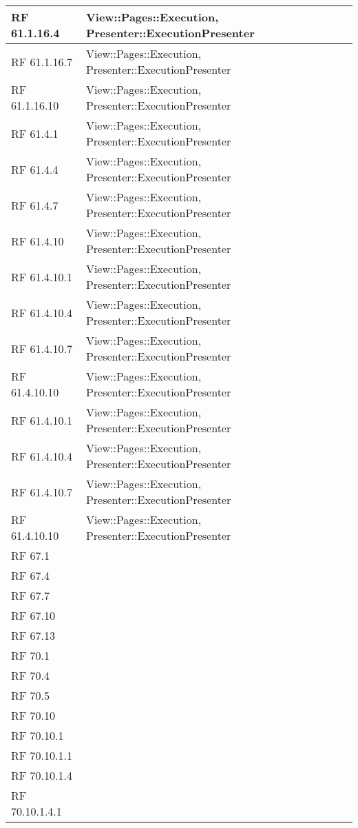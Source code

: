 {\begin{longtable} [c]{| p{2cm} | p{13cm} |}
 \hline 
RF 61.1.16.4 & View::Pages::Execution, Presenter::ExecutionPresenter\\ 
 \hline 
RF 61.1.16.7 & View::Pages::Execution, Presenter::ExecutionPresenter\\ 
 \hline 
RF 61.1.16.10 & View::Pages::Execution, Presenter::ExecutionPresenter\\ 
 \hline 
RF 61.4.1 & View::Pages::Execution, Presenter::ExecutionPresenter\\ 
 \hline 
RF 61.4.4 & View::Pages::Execution, Presenter::ExecutionPresenter\\ 
 \hline 
RF 61.4.7 & View::Pages::Execution, Presenter::ExecutionPresenter\\ 
 \hline 
RF 61.4.10 & View::Pages::Execution, Presenter::ExecutionPresenter\\ 
 \hline 
RF 61.4.10.1 & View::Pages::Execution, Presenter::ExecutionPresenter\\ 
 \hline 
RF 61.4.10.4 & View::Pages::Execution, Presenter::ExecutionPresenter\\ 
 \hline 
RF 61.4.10.7 & View::Pages::Execution, Presenter::ExecutionPresenter\\ 
 \hline 
RF 61.4.10.10 & View::Pages::Execution, Presenter::ExecutionPresenter\\ 
 \hline 
RF 61.4.10.1 & View::Pages::Execution, Presenter::ExecutionPresenter\\ 
 \hline 
RF 61.4.10.4 & View::Pages::Execution, Presenter::ExecutionPresenter\\ 
 \hline 
RF 61.4.10.7 & View::Pages::Execution, Presenter::ExecutionPresenter\\ 
 \hline 
RF 61.4.10.10 & View::Pages::Execution, Presenter::ExecutionPresenter\\ 
 \hline 
RF 67.1 & \\ 
 \hline 
RF 67.4 & \\ 
 \hline 
RF 67.7 & \\ 
 \hline 
RF 67.10 & \\ 
 \hline 
RF 67.13 & \\ 
 \hline 
RF 70.1 & \\ 
 \hline 
RF 70.4 & \\ 
 \hline 
RF 70.5 & \\ 
 \hline 
RF 70.10 & \\ 
 \hline 
RF 70.10.1 & \\ 
 \hline 
RF 70.10.1.1 & \\ 
 \hline 
RF 70.10.1.4 & \\ 
 \hline 
RF 70.10.1.4.1 & \\ 

\end{longtable}}
